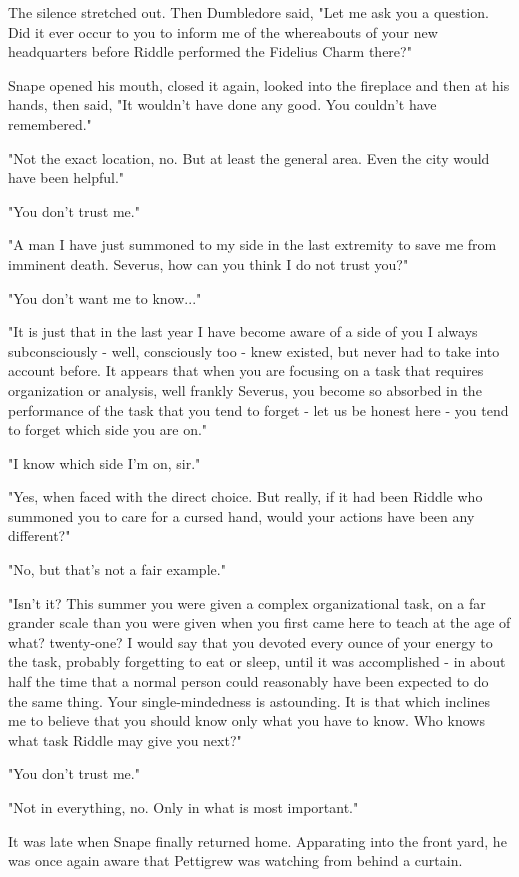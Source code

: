 \documentclass[a4paper,11pt]{article}
\begin{document}
The silence stretched out. Then Dumbledore said, "Let me ask you a question. Did it ever occur to you to inform me of the whereabouts of your new headquarters before Riddle performed the Fidelius Charm there?"

Snape opened his mouth, closed it again, looked into the fireplace and then at his hands, then said, "It wouldn't have done any good. You couldn't have remembered."

"Not the exact location, no. But at least the general area. Even the city would have been helpful."

"You don't trust me."

"A man I have just summoned to my side in the last extremity to save me from imminent death. Severus, how can you think I do not trust you?"

"You don't want me to know..."

"It is just that in the last year I have become aware of a side of you I always subconsciously - well, consciously too - knew existed, but never had to take into account before. It appears that when you are focusing on a task that requires organization or analysis, well frankly Severus, you become so absorbed in the performance of the task that you tend to forget - let us be honest here - you tend to forget which side you are on."

"I know which side I'm on, sir."

"Yes, when faced with the direct choice. But really, if it had been Riddle who summoned you to care for a cursed hand, would your actions have been any different?"

"No, but that's not a fair example."

"Isn't it? This summer you were given a complex organizational task, on a far grander scale than you were given when you first came here to teach at the age of what? twenty-one? I would say that you devoted every ounce of your energy to the task, probably forgetting to eat or sleep, until it was accomplished - in about half the time that a normal person could reasonably have been expected to do the same thing. Your single-mindedness is astounding. It is that which inclines me to believe that you should know only what you have to know. Who knows what task Riddle may give you next?"

"You don't trust me."

"Not in everything, no. Only in what is most important."

It was late when Snape finally returned home. Apparating into the front yard, he was once again aware that Pettigrew was watching from behind a curtain.
\end{document}
